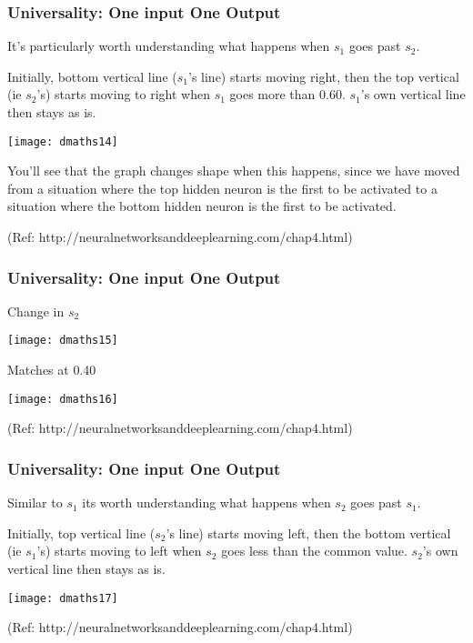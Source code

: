 \begin{frame}[fragile] \frametitle{Universality: One input One Output}
It's particularly worth understanding what happens when $s_1$ goes past $s_2$.

Initially, bottom vertical line ($s_1$'s line) starts moving right, then the top vertical (ie $s_2$'s) starts moving to right when $s_1$ goes more than 0.60. $s_1$'s own vertical line then stays as is.
\begin{center}
\texttt{[image: dmaths14]}
\end{center}

You'll see that the graph changes shape when this happens, since we have moved from a situation where the top hidden neuron is the first to be activated to a situation where the bottom hidden neuron is the first to be activated.

{\tiny (Ref: http://neuralnetworksanddeeplearning.com/chap4.html)}
\end{frame}

\begin{frame}[fragile] \frametitle{Universality: One input One Output}
Change in $s_2$

\begin{center}
\texttt{[image: dmaths15]}
\end{center}
Matches at 0.40
\begin{center}
\texttt{[image: dmaths16]}
\end{center}

{\tiny (Ref: http://neuralnetworksanddeeplearning.com/chap4.html)}
\end{frame}

\begin{frame}[fragile] \frametitle{Universality: One input One Output}
Similar to $s_1$ its worth understanding what happens when $s_2$ goes past $s_1$.

Initially, top vertical line ($s_2$'s line) starts moving left, then the bottom vertical (ie $s_1$'s) starts moving to left when $s_2$ goes less than the common value. $s_2$'s own vertical line then stays as is.
\begin{center}
\texttt{[image: dmaths17]}
\end{center}

{\tiny (Ref: http://neuralnetworksanddeeplearning.com/chap4.html)}
\end{frame}

